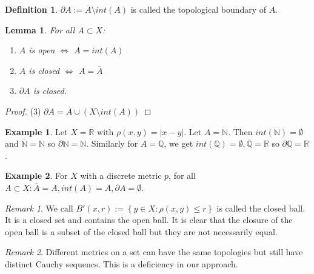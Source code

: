 \documentclass{article}
\newcommand\N{\ensuremath{\mathbb{N}}}
\newcommand\R{\ensuremath{\mathbb{R}}}
\renewcommand\O{\ensuremath{\emptyset}}
\newcommand\Q{\ensuremath{\mathbb{Q}}}
\newtheorem{lemma}[theorem]{Lemma}
\theoremstyle{definition}
\newtheorem{definition}{Definition}[subsection]
\newtheorem{eg}{Example}[subsection]
\theoremstyle{remark}
\newtheorem*{remark}{Remark}
\theoremstyle{plain}
\begin{document}
\begin{definition}
    \(\partial A := \overline{A} \setminus int(A)\) is called the topological boundary of \(A\).
\end{definition}

\begin{lemma}
    For all \(A\subset X\):
    \begin{enumerate}
        \item \(A\) is open \(\iff\) \(A = int(A)\)
        \item \(A\) is closed \(\iff\) \(A = \overline{A}\)
        \item \(\partial A\) is closed.
    \end{enumerate}
\end{lemma}
\begin{proof}
    (3) \(\partial A = \overline{A}\cup (X \setminus int(A))\)
\end{proof}

\begin{eg}
    Let \(X = \R\) with \(\rho(x,y) = |x-y|\). Let \(A = \N\). Then \(int(\N) = \O\) and \(\overline{\N} = \N\) so
    \(\partial \N = \N\). Similarly for \(A = \Q\), we get \(int(\Q) = \O, \overline{\Q} = \R\) so \(\partial \Q = \R\).
\end{eg}

\begin{eg}
    For \(X\) with a discrete metric \(p\), for all \(A\subset X: \overline{A} = A, int(A) = A, \partial A = \O\).
\end{eg}

\begin{remark}
    We call \(B'(x,r) := \left\{ y \in X: \rho(x,y) \leq r \right\}\) is called the closed ball. It is a closed set and contains the open ball. It is clear that
    the closure of the open ball is a subset of the closed ball but they are not necessarily equal. 
\end{remark}

\begin{remark}
    Different metrics on a set can have the same topologies but still have distinct Cauchy sequencs. This is a deficiency in our approach.
\end{remark}
\end{document}
